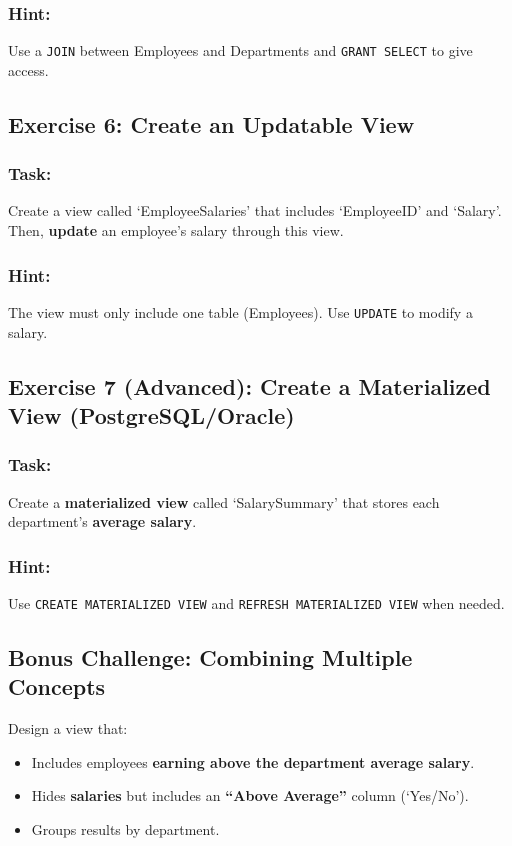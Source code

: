 \documentclass{article}
\begin{document}
\subsubsection*{Hint:}
Use a \texttt{JOIN} between Employees and Departments and \texttt{GRANT SELECT} to give access.

\subsection*{Exercise 6: Create an Updatable View}
\subsubsection*{Task:}
Create a view called `EmployeeSalaries' that includes `EmployeeID' and `Salary'. Then, \textbf{update} an employee's salary through this view.

\subsubsection*{Hint:}
The view must only include one table (Employees). Use \texttt{UPDATE} to modify a salary.

\subsection*{Exercise 7 (Advanced): Create a Materialized View (PostgreSQL/Oracle)}
\subsubsection*{Task:}
Create a \textbf{materialized view} called `SalarySummary' that stores each department’s \textbf{average salary}.

\subsubsection*{Hint:}
Use \texttt{CREATE MATERIALIZED VIEW} and \texttt{REFRESH MATERIALIZED VIEW} when needed.

\subsection*{Bonus Challenge: Combining Multiple Concepts}
Design a view that:

\begin{itemize}
  \item Includes employees \textbf{earning above the department average salary}.
  \item Hides \textbf{salaries} but includes an \textbf{``Above Average''} column (`Yes/No').
  \item Groups results by department.
\end{itemize}
\end{document}

